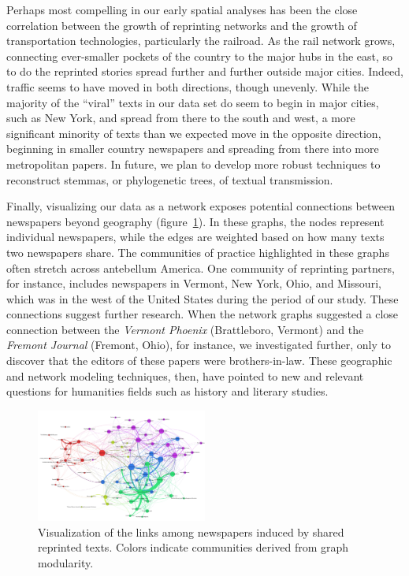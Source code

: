 \documentclass[pdftex,11pt]{article}
\begin{document}
Perhaps most compelling in our early spatial analyses has been the
close correlation between the growth of reprinting networks and the
growth of transportation technologies, particularly the railroad. As
the rail network grows, connecting ever-smaller pockets of the country
to the major hubs in the east, so to do the reprinted stories spread
further and further outside major cities. Indeed, traffic seems to
have moved in both directions, though unevenly. While the majority of
the ``viral'' texts in our data set do seem to begin in major cities,
such as New York, and spread from there to the south and west, a more
significant minority of texts than we expected move in the opposite
direction, beginning in smaller country newspapers and spreading from
there into more metropolitan papers. In future, we plan to develop
more robust techniques to reconstruct stemmas, or phylogenetic trees,
of textual transmission.

Finally, visualizing our data as a network exposes potential
connections between newspapers beyond geography
(figure~\ref{fig:network}). In these graphs, the nodes represent
individual newspapers, while the edges are weighted based on how many
texts two newspapers share. The communities of practice highlighted in
these graphs often stretch across antebellum America. One community of
reprinting partners, for instance, includes newspapers in Vermont, New
York, Ohio, and Missouri, which was in the west of the United States
during the period of our study. These connections suggest further
research.  When the network graphs suggested a close connection
between the \textit{Vermont Phoenix} (Brattleboro, Vermont) and the
\textit{Fremont Journal} (Fremont, Ohio), for instance, we
investigated further, only to discover that the editors of these
papers were brothers-in-law.  These geographic and network modeling
techniques, then, have pointed to new and relevant questions for
humanities fields such as history and literary studies.

\begin{figure}
  \centering
  \includegraphics[width=0.5\textwidth]{network}
  \caption{Visualization of the links among newspapers induced by
    shared reprinted texts.  Colors indicate communities derived from
    graph modularity.}
  \label{fig:network}
\end{figure}
\end{document}
